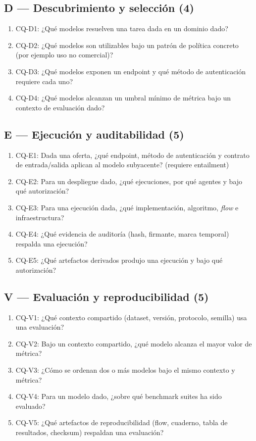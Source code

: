 \documentclass[11pt,a4paper]{article}
\newcommand{\cq}[1]{\textsf{#1}}
\begin{document}
\subsection*{D --- Descubrimiento y selección (4)}
\begin{enumerate}[label=\arabic*., leftmargin=*]
\item \cq{CQ-D1}: ¿Qué modelos resuelven una tarea dada en un dominio dado?
\item \cq{CQ-D2}: ¿Qué modelos son utilizables bajo un patrón de política concreto (por ejemplo uso no comercial)?
\item \cq{CQ-D3}: ¿Qué modelos exponen un endpoint y qué método de autenticación requiere cada uno?
\item \cq{CQ-D4}: ¿Qué modelos alcanzan un umbral mínimo de métrica bajo un contexto de evaluación dado?
\end{enumerate}

\subsection*{E --- Ejecución y auditabilidad (5)}
\begin{enumerate}[label=\arabic*., leftmargin=*]
\item \cq{CQ-E1}: Dada una oferta, ¿qué endpoint, método de autenticación y contrato de entrada/salida aplican al modelo subyacente? (requiere entailment)
\item \cq{CQ-E2}: Para un despliegue dado, ¿qué ejecuciones, por qué agentes y bajo qué autorización?
\item \cq{CQ-E3}: Para una ejecución dada, ¿qué implementación, algoritmo, \emph{flow} e infraestructura?
\item \cq{CQ-E4}: ¿Qué evidencia de auditoría (hash, firmante, marca temporal) respalda una ejecución?
\item \cq{CQ-E5}: ¿Qué artefactos derivados produjo una ejecución y bajo qué autorización?
\end{enumerate}

\subsection*{V --- Evaluación y reproducibilidad (5)}
\begin{enumerate}[label=\arabic*., leftmargin=*]
\item \cq{CQ-V1}: ¿Qué contexto compartido (dataset, versión, protocolo, semilla) usa una evaluación?
\item \cq{CQ-V2}: Bajo un contexto compartido, ¿qué modelo alcanza el mayor valor de métrica?
\item \cq{CQ-V3}: ¿Cómo se ordenan dos o más modelos bajo el mismo contexto y métrica?
\item \cq{CQ-V4}: Para un modelo dado, ¿sobre qué benchmark suites ha sido evaluado?
\item \cq{CQ-V5}: ¿Qué artefactos de reproducibilidad (flow, cuaderno, tabla de resultados, checksum) respaldan una evaluación?
\end{enumerate}
\end{document}
